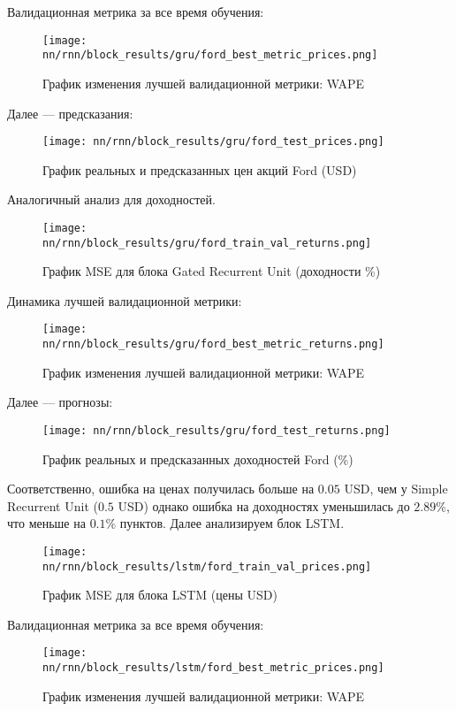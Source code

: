 \noindent Валидационная метрика за все время обучения:
\begin{figure}[H]
	\centering
	\texttt{[image: nn/rnn/block\_results/gru/ford\_best\_metric\_prices.png]}
	\caption{График изменения лучшей валидационной метрики: WAPE}
	\label{fig::gru_ford_best_metric_prices}
\end{figure}
\noindent Далее --- предсказания:
\begin{figure}[H]
	\centering
	\texttt{[image: nn/rnn/block\_results/gru/ford\_test\_prices.png]}
	\caption{График реальных и предсказанных цен акций Ford (USD)}
	\label{fig::gru_ford_test_prices}
\end{figure}
\noindent Аналогичный анализ для доходностей.
\begin{figure}[H]
	\centering
	\texttt{[image: nn/rnn/block\_results/gru/ford\_train\_val\_returns.png]}
	\caption{График MSE для блока Gated Recurrent Unit (доходности \%)}
	\label{fig::gru_ford_train_val_returns}
\end{figure}
\noindent Динамика лучшей валидационной метрики:
\begin{figure}[H]
	\centering
	\texttt{[image: nn/rnn/block\_results/gru/ford\_best\_metric\_returns.png]}
	\caption{График изменения лучшей валидационной метрики: WAPE}
	\label{fig::gru_ford_best_metric_returns}
\end{figure}
\noindent Далее --- прогнозы:
\begin{figure}[H]
	\centering
	\texttt{[image: nn/rnn/block\_results/gru/ford\_test\_returns.png]}
	\caption{График реальных и предсказанных доходностей Ford (\%)}
	\label{fig::gru_ford_test_returns}
\end{figure}
Соответственно, ошибка на ценах получилась больше на $0.05$ USD, чем у Simple Recurrent Unit ($0.5$ USD) однако ошибка на доходностях уменьшилась до $2.89\%$, что меньше на $0.1\%$ пунктов. Далее анализируем блок LSTM.
 \begin{figure}[H]
 	\centering
 	\texttt{[image: nn/rnn/block\_results/lstm/ford\_train\_val\_prices.png]}
 	\caption{График MSE для блока LSTM (цены USD)}
 	\label{fig::lstm_ford_train_val_prices}
 \end{figure}
 \noindent Валидационная метрика за все время обучения:
 \begin{figure}[H]
 	\centering
 	\texttt{[image: nn/rnn/block\_results/lstm/ford\_best\_metric\_prices.png]}
 	\caption{График изменения лучшей валидационной метрики: WAPE}
 	\label{fig::lstm_ford_best_metric_prices}
 \end{figure}
